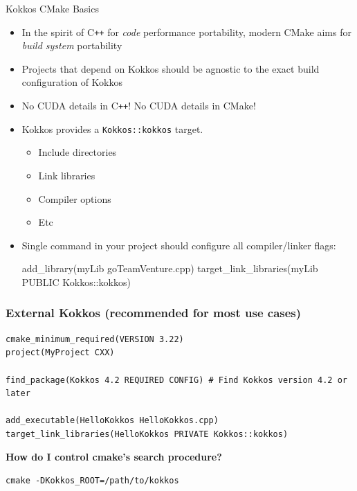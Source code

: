 \begin{frame}[fragile]{Kokkos CMake Basics}
\begin{itemize}
\item In the spirit of C\texttt{++} for \emph{code} performance portability, modern CMake aims for \emph{build system} portability
\item Projects that depend on Kokkos should be agnostic to the exact build configuration of Kokkos
\item No CUDA details in C\texttt{++}! No CUDA details in CMake!
\item Kokkos provides a \texttt{Kokkos::kokkos} target.
  \begin{itemize}
  \item Include directories
  \item Link libraries
  \item Compiler options
  \item Etc
  \end{itemize}
 
\item Single command in your project should configure all compiler/linker flags:

\begin{shell}
add_library(myLib goTeamVenture.cpp)
target_link_libraries(myLib PUBLIC Kokkos::kokkos)
\end{shell}
\end{itemize}
\end{frame}

\begin{frame}[fragile]
\frametitle{External Kokkos (recommended for most use cases)}

\begin{verbatim}
cmake_minimum_required(VERSION 3.22)
project(MyProject CXX)

find_package(Kokkos 4.2 REQUIRED CONFIG) # Find Kokkos version 4.2 or later

add_executable(HelloKokkos HelloKokkos.cpp)
target_link_libraries(HelloKokkos PRIVATE Kokkos::kokkos)
\end{verbatim}

\vspace{2eM}
\textbf{How do I control cmake's search procedure?}

\vspace{1eM}
\begin{verbatim}
cmake -DKokkos_ROOT=/path/to/kokkos
\end{verbatim}
\end{frame}

